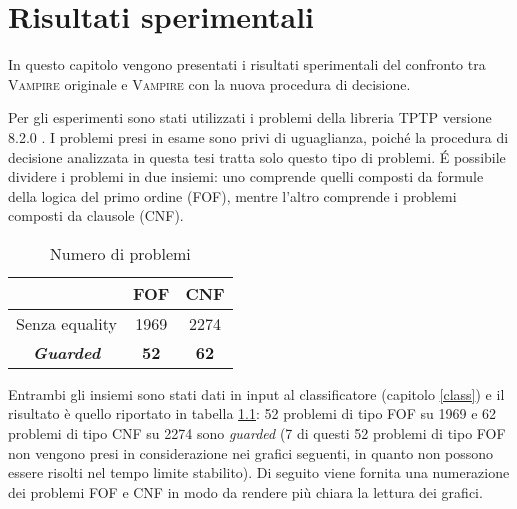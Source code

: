 \chapter{Risultati sperimentali}\label{third-c}
In questo capitolo vengono presentati i risultati sperimentali del confronto 
tra \textsc{Vampire} originale e \textsc{Vampire} con la nuova procedura di decisione.

Per gli esperimenti sono stati utilizzati i problemi della libreria TPTP versione 8.2.0 \cite{Sut17}.
I problemi presi in esame sono privi di uguaglianza, poiché la procedura di decisione 
analizzata in questa tesi tratta 
solo questo tipo di problemi. 
\'E possibile dividere i problemi in due insiemi:
uno comprende quelli composti da formule della logica del primo ordine (FOF), mentre l'altro 
comprende i problemi composti da clausole (CNF).
\begin{table}[H]
    \begin{center}
    \caption{Numero di problemi}
    \begin{tabular}{ccc}
        \toprule %
        &\textbf{FOF} & \textbf{CNF}\\
        \midrule %
        Senza equality & 1969 & 2274\\
        \bottomrule %
        \textbf{\emph{Guarded}} & \textbf{52} & \textbf{62}\\
    \end{tabular}
    \label{tab:prob}
\end{center}
\end{table} 
Entrambi gli insiemi sono stati dati in input 
al classificatore (capitolo \ref{class}) e il risultato è quello riportato in tabella \ref{tab:prob}:
52 problemi di tipo FOF su 1969 e 62 problemi di tipo CNF su 2274 sono \emph{guarded}
(7 di questi 52 problemi di tipo FOF non vengono presi in considerazione nei grafici seguenti, in quanto 
non possono essere risolti nel tempo limite stabilito). Di seguito viene fornita una numerazione 
dei problemi FOF e CNF in modo da rendere più chiara la lettura dei grafici.
\noindent\begin{table}[H]
    \caption{Numerazione dei problemi FOF}
        
\end{table}
